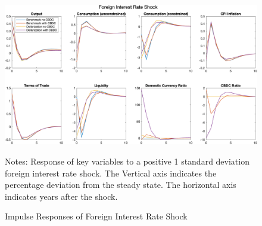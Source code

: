 \documentclass[12pt]{article}
\begin{document}
\begin{figure}[h!]
\includegraphics[width=\textwidth]{R_STAR}
\label{IRF5}
\caption{Impulse Responses of Foreign Interest Rate Shock}
\scriptsize{Notes: Response of key variables to a positive 1 standard deviation foreign interest rate shock. The Vertical axis indicates the percentage deviation from the steady state. The horizontal axis indicates years after the shock.}
\end{figure}
\end{document}
